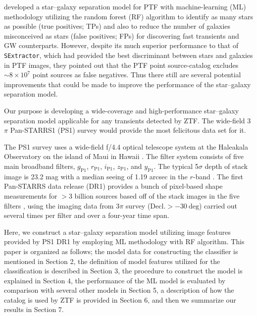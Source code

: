 \documentclass[twocolumn]{aastex62}
\begin{document}
{\cite{Miller17} developed a star--galaxy separation model for PTF 
with machine-learning (ML) methodology utilizing the random forest (RF) algorithm 
to identify as many stars as possible (true positives; TPs) 
and also to reduce the number of galaxies misconceived as stars (false positives; FPs) 
for discovering fast transients and GW counterparts. 
However, despite its much superior performance to that of \texttt{SExtractor}, 
which had provided the best discriminant between stars and galaxies in PTF images, 
they pointed out that the PTF point source-catalog 
excludes $\sim 8\times10^7$ point sources as false negatives. 
Thus there still are several potential improvements that could be made to improve the performance 
of the star--galaxy separation model. 

Our purpose is developing a wide-coverage and high-performance star--galaxy separation model 
applicable for any transients detected by ZTF.  
The wide-field 3$\pi$ Pan-STARRS1 (PS1) survey \citep{Chambers16} 
would provide the most felicitous data set for it. 

The PS1 survey uses a wide-field f/4.4 optical telescope system 
at the Haleakala Observatory on the island of Maui in Hawaii \citep{Hodapp04}. 
The filter system consists of five main broadband filters, 
$g_{\mathrm{P1}}$, $r_{\mathrm{P1}}$, $i_{\mathrm{P1}}$, $z_{\mathrm{P1}}$, and $y_{\mathrm{P1}}$. 
The typical 5$\sigma$ depth of stack image is 23.2 mag 
with a median seeing of 1.19 arcsec  in the $r$-band \citep{Tonry12, Schlafly12, Chambers16}. 
The first Pan-STARRS data release (DR1) provides a bunch of pixel-based shape measurements 
\citep{Flewelling16} 
for $>$3 billion sources based off of the stack images in the five filters \citep{Magnier16b}, 
using the imaging data from 3$\pi$ survey ($\mathrm{Decl.}>-30\ \mathrm{deg}$) 
carried out several times per filter and over a four-year time span. 

Here, we construct a star--galaxy separation model 
utilizing image features provided by PS1 DR1 
by employing ML methodology with RF algorithm. 
This paper is organized as follows; 
the model data for constructing the classifier is mentioned in Section 2, 
the definition of model features utilized for the classification is described in Section 3, 
the procedure to construct the model is explained in Section 4, 
the performance of the ML model is evaluated by comparison with several other models in Section 5, 
a description of how the catalog is used by ZTF is provided in Section 6, 
and then we summarize our results in Section 7. 
}
\end{document}
